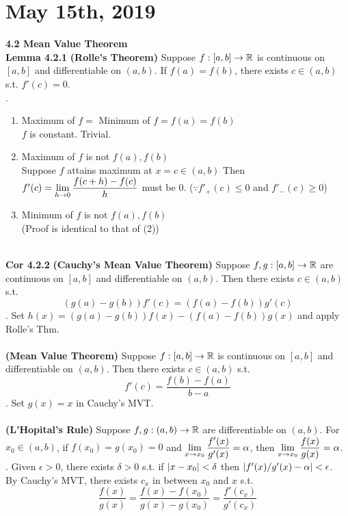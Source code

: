 \section*{May 15th, 2019}
\textbf{4.2 Mean Value Theorem}\\
\textbf{Lemma 4.2.1} \textbf{(Rolle's Theorem)} Suppose $f:[a, b]\rightarrow \mathbb{R}$ is continuous on $[a, b]$ and differentiable on $(a, b)$. If $f(a) = f(b)$, there exists $c \in (a, b)$ s.t. $f'(c) = 0$.\\
\pf.
\begin{enumerate}
	\item Maximum of $f = $ Minimum of $f =f(a) = f(b)$ \\
	$f$ is constant. Trivial.
	\item Maximum of $f$ is not $f(a), f(b)$\\
	Suppose $f$ attains maximum at $x = c \in (a, b)$ Then $f'(c) = \displaystyle\lim_{h\rightarrow 0}\frac{f(c+h)-f(c)}{h}$ must be 0. ($\because f'_+(c) \leq 0$ and $f'_-(c) \geq 0$)
	\item Minimum of $f$ is not $f(a), f(b)$\\
	(Proof is identical to that of (2))
\end{enumerate}~\\
\textbf{Cor 4.2.2} \textbf{(Cauchy's Mean Value Theorem)} Suppose $f, g:[a, b]\rightarrow \mathbb{R}$ are continuous on $[a, b]$ and differentiable on $(a, b)$. Then there exists $c\in (a, b)$ s.t. $$(g(a) - g(b))f'(c) = (f(a) - f(b))g'(c)$$
\pf. Set $h(x) = (g(a) - g(b))f(x) - (f(a)-f(b))g(x)$ and apply Rolle's Thm.\\
\\
 \textbf{(Mean Value Theorem)} Suppose $f :[a, b]\rightarrow \mathbb{R}$ is continuous on $[a, b]$ and differentiable on $(a, b)$. Then there exists $c\in (a, b)$ s.t. $$f'(c) = \frac{f(b)-f(a)}{b - a}$$
\pf. Set $g(x) = x$ in Cauchy's MVT.\\
\\
 \textbf{(L'Hopital's Rule)} Suppose $f, g:(a, b)\rightarrow \mathbb{R}$ are differentiable on $(a, b)$. For $x_0\in (a, b)$, if $f(x_0) = g(x_0) = 0$ and $\displaystyle\lim_{x\rightarrow x_0} \frac{f'(x)}{g'(x)} = \alpha$, then $\displaystyle\lim_{x\rightarrow x_0}\frac{f(x)}{g(x)}=\alpha$.\\
\pf. Given $\epsilon > 0$, there exists $\delta > 0$ s.t. if $\left|x - x_0\right| < \delta$ then $\left|f'(x) / g'(x) - \alpha\right| < \epsilon$.\\ By Cauchy's MVT, there exists $c_x$ in between $x_0$ and $x$ s.t. $$\frac{f(x)}{g(x)} = \frac{f(x) - f(x_0)}{g(x) - g(x_0)} = \frac{f'(c_x)}{g'(c_x)}$$
